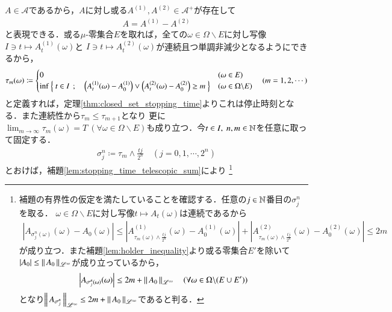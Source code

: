 	\begin{prf}
		$A \in \mathcal{A}$であるから，$A$に対し或る$A^{(1)},A^{(2)} \in \mathcal{A}^+$が存在して
		\begin{align}
			A = A^{(1)} - A^{(2)}
		\end{align}
		と表現できる．或る$\mu$-零集合$E$を取れば，全ての$\omega \in \Omega \backslash E$に対し写像$I \ni t \longmapsto A_t^{(1)}(\omega)$と
		$I \ni t \longmapsto A_t^{(2)}(\omega)$が連続且つ単調非減少となるようにできるから，
		\begin{align}
			\tau_m(\omega) \coloneqq
			\begin{cases}
				0 & (\omega \in E) \\
				\operatorname*{inf}_{} \left\{\ t \in I\ \, ; \quad \left( A_t^{(1)}(\omega) - A_0^{(1)} \right) \vee \left( A_t^{(2)}(\omega) - A_0^{(2)} \right) \geq m\ \right\} & (\omega \in \Omega \backslash E)
			\end{cases}
			\quad (m=1,2,\cdots)
		\end{align}
		と定義すれば，定理\ref{thm:closed_set_stopping_time}よりこれは停止時刻となる．また連続性から$\tau_m \leq \tau_{m+1}$となり
		更に$\lim_{m \to \infty}\tau_m(\omega) = T\ (\forall \omega \in \Omega \backslash E)も成り立つ．
		$今$t \in I,\ n,m \in \mathbb{N}$を任意に取って固定する．
		\begin{align}
			\sigma_j^n \coloneqq \tau_m \wedge \frac{tj}{2^n} \quad (j = 0,1,\cdots, 2^n)
		\end{align}
		とおけば，補題\ref{lem:stopping_time_telescopic_sum}により
		\footnote{
			補題の有界性の仮定を満たしていることを確認する．任意の$j \in \mathbb{N}$番目の$\sigma_j^n$を取る．
			$\omega \in \Omega \backslash E$に対し写像$t \longmapsto A_t(\omega)$は連続であるから
			\begin{align}
				\left| A_{\sigma_j^n(\omega)}(\omega) - A_0(\omega) \right| 
				\leq \left| A^{(1)}_{\tau_m(\omega)\wedge \frac{tj}{2^n}}(\omega) - A^{(1)}_0(\omega) \right| + \left| A^{(2)}_{\tau_m(\omega)\wedge \frac{tj}{2^n}}(\omega) - A^{(2)}_0(\omega) \right|
				\leq 2m
			\end{align}
			が成り立つ．また補題\ref{lem:holder_inequality}より或る零集合$E'$を除いて$|A_0| \leq \left\|\, A_0\, \right\|_{\mathscr{L}^\infty}$が成り立っているから，
			\begin{align}
				\left| A_{\sigma_j^n(\omega)}(\omega) \right| \leq 2m + \left\|\, A_0\, \right\|_{\mathscr{L}^\infty} \quad (\forall \omega \in \Omega \backslash (E \cup E'))
			\end{align}
			となり$\left\|\, A_{\sigma_j^n}\, \right\|_{\mathscr{L}^\infty} \leq 2m + \left\|\, A_0\, \right\|_{\mathscr{L}^\infty}$であると判る．
}
\end{prf}
